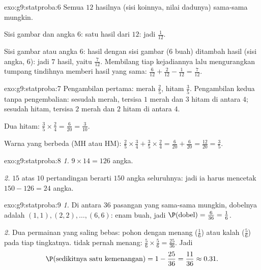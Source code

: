 \begin{solution}{exo:g9:statproba:6}
Semua $12$ hasilnya (sisi koinnya, nilai dadunya) sama-sama
mungkin.

Sisi gambar dan angka $6$: satu hasil dari $12$: jadi $\frac{1}{12}$.

Sisi gambar atau angka $6$: hasil dengan sisi gambar ($6$ buah)
ditambah hasil (sisi angka, $6$): jadi $7$ hasil, yaitu
$\frac{7}{12}$. Membilang tiap kejadiannya lalu mengurangkan
tumpang tindihnya memberi hasil yang sama:
$\frac{6}{12} + \frac{2}{12} - \frac{1}{12} = \frac{7}{12}$.
\end{solution}

\begin{solution}{exo:g9:statproba:7}
Pengambilan pertama: merah $\frac25$, hitam $\frac35$. Pengambilan
kedua tanpa pengembalian: sesudah merah, tersisa $1$ merah dan $3$
hitam di antara $4$; sesudah hitam, tersisa $2$ merah dan $2$ hitam di
antara $4$.

Dua hitam: $\frac35 \times \frac24 = \frac{6}{20} = \frac{3}{10}$.

Warna yang berbeda (MH atau HM):
$\frac25 \times \frac34 + \frac35 \times \frac24
= \frac{6}{20} + \frac{6}{20} = \frac{12}{20} = \frac35$.
\end{solution}

\begin{solution}{exo:g9:statproba:8}
\emph{1.} $9 \times 14 = 126$ angka.

\emph{2.}  $15$ atas $10$ pertandingan berarti $150$ angka
seluruhnya: jadi ia harus mencetak $150 - 126 = 24$ angka.
\end{solution}

\begin{solution}{exo:g9:statproba:9}
\emph{1.} Di antara $36$ pasangan yang sama-sama mungkin, dobelnya
adalah $(1,1), (2,2), \dots, (6,6)$: enam buah, jadi
$\P(\text{dobel}) = \frac{6}{36} = \frac16$.

\emph{2.} Dua permainan yang saling bebas: pohon dengan menang
($\frac16$) atau kalah ($\frac56$) pada tiap tingkatnya.  tidak
pernah menang: $\frac56 \times \frac56 = \frac{25}{36}$. Jadi
\[
\P(\text{sedikitnya satu kemenangan}) = 1 - \frac{25}{36} = \frac{11}{36}
\approx 0.31 .
\]
\end{solution}

